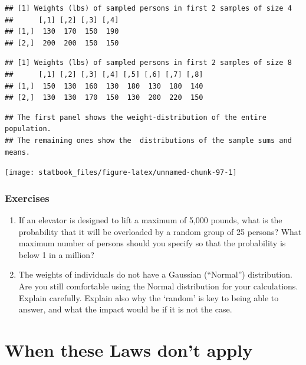 \documentclass[]{book}
\begin{document}
\begin{verbatim}
## [1] Weights (lbs) of sampled persons in first 2 samples of size 4
##      [,1] [,2] [,3] [,4]
## [1,]  130  170  150  190
## [2,]  200  200  150  150
\end{verbatim}

\begin{verbatim}
## [1] Weights (lbs) of sampled persons in first 2 samples of size 8
##      [,1] [,2] [,3] [,4] [,5] [,6] [,7] [,8]
## [1,]  150  130  160  130  180  130  180  140
## [2,]  130  130  170  150  130  200  220  150
\end{verbatim}

\begin{verbatim}
## The first panel shows the weight-distribution of the entire population.
## The remaining ones show the  distributions of the sample sums and means.
\end{verbatim}

\begin{center}\texttt{[image: statbook\_files/figure-latex/unnamed-chunk-97-1]} \end{center}

\hypertarget{exercises-6}{%
\subsubsection{Exercises}\label{exercises-6}}

\begin{enumerate}
\def\labelenumi{\arabic{enumi}.}
\item
  If an elevator is designed to lift a maximum of 5,000 pounds, what is the probability that it will be overloaded by a random group of 25 persons? What maximum number of persons should you specify so that the probability is below 1 in a million?
\item
  The weights of individuals do not have a Gaussian (``Normal'') distribution. Are you still comfortable using the Normal distribution for your calculations. Explain carefully. Explain also why the `random' is key to being able to answer, and what the impact would be if it is not the case.
\end{enumerate}

\hypertarget{when-these-laws-dont-apply}{%
\section{When these Laws don't apply}\label{when-these-laws-dont-apply}}
\end{document}
